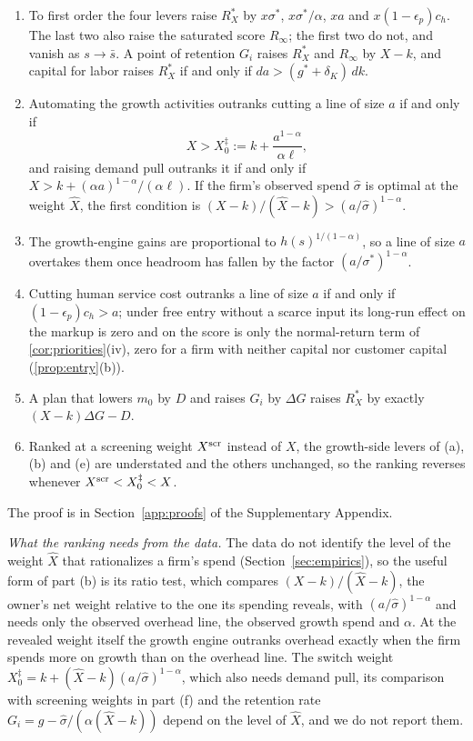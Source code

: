 \begin{proposition}\label{prop:levers-position}
\begin{enumerate}
\item[(a)] To first order the four levers raise $R^*_X$ by $x\sigma^*$, $x\sigma^*/\alpha$, $xa$ and $x(1-\epsilon_p)c_h$. The last two also raise the saturated score $R_\infty$; the first two do not, and vanish as $s\to\bar s$. A point of retention $G_i$ raises $R^*_X$ and $R_\infty$ by $X-k$, and capital for labor raises $R^*_X$ if and only if $da>(g^*+\delta_K)\,dk$.
\item[(b)] Automating the growth activities outranks cutting a line of size $a$ if and only if
\[
X>X^\ddagger_0:=k+\frac{a^{1-\alpha}}{\alpha\ell},
\]
and raising demand pull outranks it if and only if $X>k+(\alpha a)^{1-\alpha}/(\alpha\ell)$. If the firm's observed spend $\hat\sigma$ is optimal at the weight $\hat X$, the first condition is $(X-k)/(\hat X-k)>(a/\hat\sigma)^{1-\alpha}$.
\item[(c)] The growth-engine gains are proportional to $h(s)^{1/(1-\alpha)}$, so a line of size $a$ overtakes them once headroom has fallen by the factor $(a/\sigma^*)^{1-\alpha}$.
\item[(d)] Cutting human service cost outranks a line of size $a$ if and only if $(1-\epsilon_p)c_h>a$; under free entry without a scarce input its long-run effect on the markup is zero and on the score is only the normal-return term of \autoref{cor:priorities}(iv), zero for a firm with neither capital nor customer capital (\autoref{prop:entry}(b)).
\item[(e)] A plan that lowers $m_0$ by $D$ and raises $G_i$ by $\Delta G$ raises $R^*_X$ by exactly $(X-k)\Delta G-D$.
\item[(f)] Ranked at a screening weight $X^{\rm scr}$ instead of $X$, the growth-side levers of (a), (b) and (e) are understated and the others unchanged, so the ranking reverses whenever $X^{\rm scr}<X^\ddagger_0<X$.
\end{enumerate}
\end{proposition}

\noindent The proof is in Section~\ref{app:proofs} of the Supplementary Appendix.

\smallskip
\emph{What the ranking needs from the data.} The data do not identify the level of the weight $\hat X$ that rationalizes a firm's spend (Section~\ref{sec:empirics}), so the useful form of part (b) is its ratio test, which compares $(X-k)/(\hat X-k)$, the owner's net weight relative to the one its spending reveals, with $(a/\hat\sigma)^{1-\alpha}$ and needs only the observed overhead line, the observed growth spend and $\alpha$. At the revealed weight itself the growth engine outranks overhead exactly when the firm spends more on growth than on the overhead line. The switch weight $X^\ddagger_0=k+(\hat X-k)(a/\hat\sigma)^{1-\alpha}$, which also needs demand pull, its comparison with screening weights in part (f) and the retention rate $G_i=g-\hat\sigma/(\alpha(\hat X-k))$ depend on the level of $\hat X$, and we do not report them.

